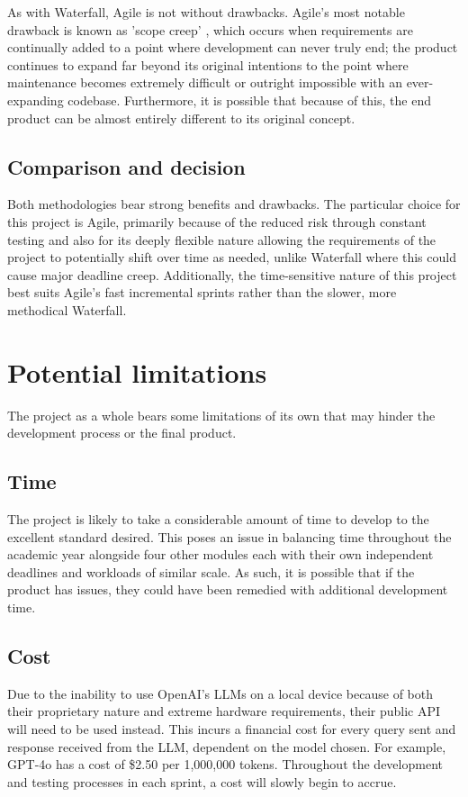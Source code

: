 \para As with Waterfall, Agile is not without drawbacks. Agile's most notable drawback is known as 'scope creep' \autocite{malsamWhatScopeCreep2024},
which occurs when requirements are continually added to a point where development can never truly end; the product continues to expand 
far beyond its original intentions to the point where maintenance becomes extremely difficult or outright impossible with an 
ever-expanding codebase. Furthermore, it is possible that because of this, the end product can be almost entirely different to its original concept.

\subsection{Comparison and decision}

Both methodologies bear strong benefits and drawbacks. The particular choice for this project is Agile, primarily because of the reduced 
risk through constant testing and also for its deeply flexible nature allowing the requirements of the project to potentially shift 
over time as needed, unlike Waterfall where this could cause major deadline creep. Additionally, the time-sensitive nature of this project 
best suits Agile's fast incremental sprints rather than the slower, more methodical Waterfall.

\section{Potential limitations}
The project as a whole bears some limitations of its own that may hinder the development process or the final product.

\subsection{Time}
The project is likely to take a considerable amount of time to develop to the excellent standard desired. This poses an issue 
in balancing time throughout the academic year alongside four other modules each with their own independent deadlines and workloads
of similar scale. As such, it is possible that if the product has issues, they could have been remedied with additional development 
time.

\subsection{Cost}
Due to the inability to use OpenAI's LLMs on a local device because of both their proprietary nature and extreme hardware requirements,
their public API will need to be used instead. This incurs a financial cost for every query sent and response received from the LLM,
dependent on the model chosen. For example, GPT-4o has a cost of \$2.50 per 1,000,000 tokens. Throughout the development and testing 
processes in each sprint, a cost will slowly begin to accrue.

